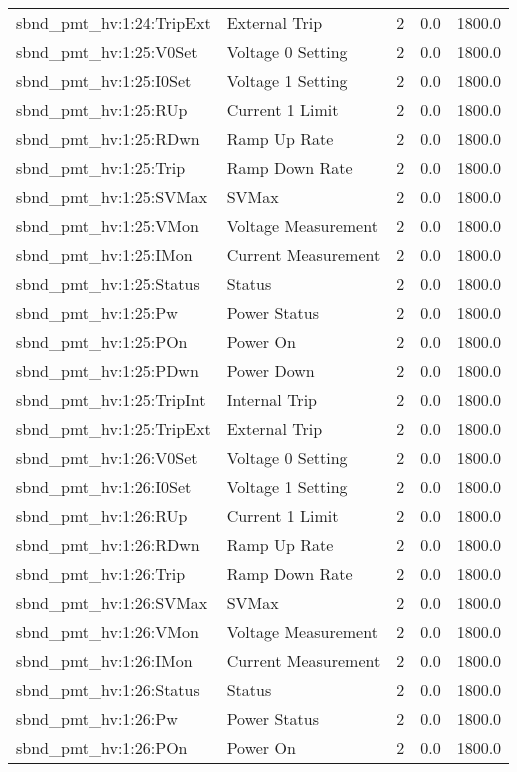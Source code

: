 \begin{center}
\begin{longtable}{l | l l l l }
sbnd\_pmt\_hv:1:24:TripExt & External Trip & 2 & 0.0 & 1800.0\\ 
sbnd\_pmt\_hv:1:25:V0Set & Voltage 0 Setting & 2 & 0.0 & 1800.0\\ 
sbnd\_pmt\_hv:1:25:I0Set & Voltage 1 Setting & 2 & 0.0 & 1800.0\\ 
sbnd\_pmt\_hv:1:25:RUp & Current 1 Limit & 2 & 0.0 & 1800.0\\ 
sbnd\_pmt\_hv:1:25:RDwn & Ramp Up Rate & 2 & 0.0 & 1800.0\\ 
sbnd\_pmt\_hv:1:25:Trip & Ramp Down Rate & 2 & 0.0 & 1800.0\\ 
sbnd\_pmt\_hv:1:25:SVMax & SVMax & 2 & 0.0 & 1800.0\\ 
sbnd\_pmt\_hv:1:25:VMon & Voltage Measurement & 2 & 0.0 & 1800.0\\ 
sbnd\_pmt\_hv:1:25:IMon & Current Measurement & 2 & 0.0 & 1800.0\\ 
sbnd\_pmt\_hv:1:25:Status & Status & 2 & 0.0 & 1800.0\\ 
sbnd\_pmt\_hv:1:25:Pw & Power Status & 2 & 0.0 & 1800.0\\ 
sbnd\_pmt\_hv:1:25:POn & Power On & 2 & 0.0 & 1800.0\\ 
sbnd\_pmt\_hv:1:25:PDwn & Power Down & 2 & 0.0 & 1800.0\\ 
sbnd\_pmt\_hv:1:25:TripInt & Internal Trip & 2 & 0.0 & 1800.0\\ 
sbnd\_pmt\_hv:1:25:TripExt & External Trip & 2 & 0.0 & 1800.0\\ 
sbnd\_pmt\_hv:1:26:V0Set & Voltage 0 Setting & 2 & 0.0 & 1800.0\\ 
sbnd\_pmt\_hv:1:26:I0Set & Voltage 1 Setting & 2 & 0.0 & 1800.0\\ 
sbnd\_pmt\_hv:1:26:RUp & Current 1 Limit & 2 & 0.0 & 1800.0\\ 
sbnd\_pmt\_hv:1:26:RDwn & Ramp Up Rate & 2 & 0.0 & 1800.0\\ 
sbnd\_pmt\_hv:1:26:Trip & Ramp Down Rate & 2 & 0.0 & 1800.0\\ 
sbnd\_pmt\_hv:1:26:SVMax & SVMax & 2 & 0.0 & 1800.0\\ 
sbnd\_pmt\_hv:1:26:VMon & Voltage Measurement & 2 & 0.0 & 1800.0\\ 
sbnd\_pmt\_hv:1:26:IMon & Current Measurement & 2 & 0.0 & 1800.0\\ 
sbnd\_pmt\_hv:1:26:Status & Status & 2 & 0.0 & 1800.0\\ 
sbnd\_pmt\_hv:1:26:Pw & Power Status & 2 & 0.0 & 1800.0\\ 
sbnd\_pmt\_hv:1:26:POn & Power On & 2 & 0.0 & 1800.0\\ 

\end{longtable}
\end{center}
